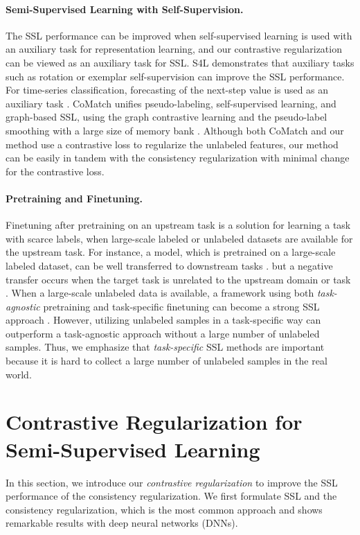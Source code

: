 \documentclass[letterpaper]{article} \usepackage{aaai22}  \usepackage{times}  \usepackage{helvet}  \usepackage{courier}  \usepackage[hyphens]{url}  \usepackage{graphicx} \urlstyle{rm} \def\UrlFont{\rm}  \usepackage{natbib}  \usepackage{caption} \DeclareCaptionStyle{ruled}{labelfont=normalfont,labelsep=colon,strut=off} \frenchspacing  \setlength{\pdfpagewidth}{8.5in}  \setlength{\pdfpageheight}{11in}  \usepackage{algorithm}
\begin{document}
\paragraph{Semi-Supervised Learning with Self-Supervision.} The SSL performance can be improved when self-supervised learning is used with an auxiliary task for representation learning, and our contrastive regularization can be viewed as an auxiliary task for SSL.
S4L \cite{zhai2019s4l} demonstrates that auxiliary tasks such as rotation or exemplar self-supervision can improve the SSL performance.
For time-series classification, forecasting of the next-step value is used as an auxiliary task \cite{jawed2020self}. 
CoMatch \cite{li2020comatch} unifies pseudo-labeling, self-supervised learning, and graph-based SSL, using the graph contrastive learning and the pseudo-label smoothing with a large size of memory bank \cite{he2020momentum}.
Although both CoMatch and our method use a contrastive loss to regularize the unlabeled features, our method can be easily in tandem with the consistency regularization with minimal change for the contrastive loss.


\paragraph{Pretraining and Finetuning.}
Finetuning after pretraining on an upstream task is a solution for learning a task with scarce labels, when large-scale labeled or unlabeled datasets are available for the upstream task.
For instance, a model, which is pretrained on a large-scale labeled dataset, can be well transferred to downstream tasks \cite{kolesnikov2019large}.
but a negative transfer occurs when the target task is unrelated to the upstream domain or task \cite{zamir2018taskonomy}.
When a large-scale unlabeled data is available, a framework using both \textit{task-agnostic} pretraining and task-specific finetuning can become a strong SSL approach \cite{vincent2010stacked,he2020momentum,chen2020big}.
However, utilizing unlabeled samples in a task-specific way can outperform a task-agnostic approach without a large number of unlabeled samples.
Thus, we emphasize that \textit{task-specific} SSL methods are important because it is hard to collect a large number of unlabeled samples in the real world.



\section{Contrastive Regularization for Semi-Supervised Learning}
\label{sec:method}
In this section, we introduce our \textit{contrastive regularization} to improve the SSL performance of the consistency regularization.
We first formulate SSL and the consistency regularization, which is the most common approach and shows remarkable results with deep neural networks (DNNs).
\end{document}
